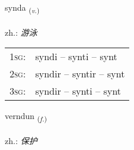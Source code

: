 \documentclass[frontgrid, backgrid]{flacards}\usepackage[]{graphicx}\usepackage[]{xcolor}
\begin{document}
\renewcommand{\flhead}{\vskip5pt \fboxsep=0pt {\small\bfseries\footnotesize Sagnorð | 动词}}
\renewcommand{\fcfoot}{\vskip5pt \fboxsep=0pt \hspace{2pt}{\small\bfseries\footnotesize 3K}}

\renewcommand{\blhead}{\vskip5pt {\small\bfseries\footnotesize Sagnorð | 动词 }}
\renewcommand{\bcfoot}{\vskip5pt \hspace{2pt}{\small\bfseries\footnotesize 3K}}


{synda \small{\textsubscript{(\textit{v.})}} \\[1ex] %
\textphonetic{[sɪnta]} \\
zh.: \emph{游泳} \\  [2ex]
\renewcommand*{\arraystretch}{0.8}
\begin{tabular}{p{1cm}l}
\textsc{1sg}: & syndi -- synti -- synt \\ 
\textsc{2sg}: & syndir -- syntir -- synt \\ 
\textsc{3sg}: & syndir -- synti -- synt \\ 
\end{tabular}
}

\renewcommand{\flhead}{\vskip5pt \fboxsep=0pt {\small\bfseries\footnotesize Nafnorð | 名词}}
\renewcommand{\fcfoot}{\vskip5pt \fboxsep=0pt \hspace{2pt}{\small\bfseries\footnotesize 3K}}

\renewcommand{\blhead}{\vskip5pt {\small\bfseries\footnotesize Nafnorð | 名词 }}
\renewcommand{\bcfoot}{\vskip5pt \hspace{2pt}{\small\bfseries\footnotesize 3K}}


{verndun \small{\textsubscript{(\textit{f.})}} \\[1ex] %
\textphonetic{[vɛrntʏn]} \\
zh.: \emph{保护} \\  [2ex]
\renewcommand*{\arraystretch}{0.8}
}
\end{document}
